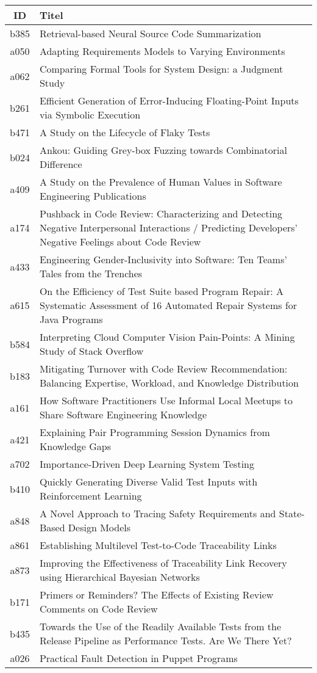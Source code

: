 \begin{table}[h!]
    \begin{tabular}{ c | p{14cm} }
        ID & Titel  \\
        \hline
        b385 & Retrieval-based Neural Source Code Summarization  \\
        a050 & Adapting Requirements Models to Varying Environments  \\
        a062 & Comparing Formal Tools for System Design: a Judgment Study  \\
        b261 & Efficient Generation of Error-Inducing Floating-Point Inputs via Symbolic Execution  \\
        b471 & A Study on the Lifecycle of Flaky Tests  \\
        b024 & Ankou: Guiding Grey-box Fuzzing towards Combinatorial Difference  \\
        a409 & A Study on the Prevalence of Human Values in Software Engineering Publications  \\
        a174 & Pushback in Code Review: Characterizing and Detecting Negative Interpersonal Interactions / Predicting Developers’ Negative Feelings about Code Review  \\
        a433 & Engineering Gender-Inclusivity into Software: Ten Teams' Tales from the Trenches  \\
        a615 & On the Efficiency of Test Suite based Program Repair: A Systematic Assessment of 16 Automated Repair Systems for Java Programs  \\
        b584 & Interpreting Cloud Computer Vision Pain-Points: A Mining Study of Stack Overflow  \\
        b183 & Mitigating Turnover with Code Review Recommendation: Balancing Expertise, Workload, and Knowledge Distribution  \\
        a161 & How Software Practitioners Use Informal Local Meetups to Share Software Engineering Knowledge  \\
        a421 & Explaining Pair Programming Session Dynamics from Knowledge Gaps  \\
        a702 & Importance-Driven Deep Learning System Testing  \\
        b410 & Quickly Generating Diverse Valid Test Inputs with Reinforcement Learning  \\
        a848 & A Novel Approach to Tracing Safety Requirements and State-Based Design Models  \\
        a861 & Establishing Multilevel Test-to-Code Traceability Links  \\
        a873 & Improving the Effectiveness of Traceability Link Recovery using Hierarchical Bayesian Networks  \\
        b171 & Primers or Reminders? The Effects of Existing Review Comments on Code Review  \\
        b435 & Towards the Use of the Readily Available Tests from the Release Pipeline as Performance Tests. Are We There Yet?\\
        a026 & Practical Fault Detection in Puppet Programs  \\
    \end{tabular}
\end{table}

